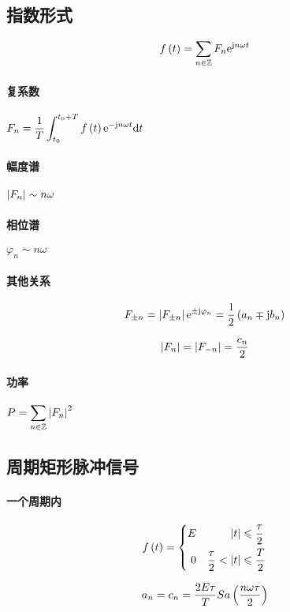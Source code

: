 \documentclass{article}
\begin{document}
\subsection{指数形式}

\[f\left(t\right)=\sum_{n\in\mathbb Z} F_n\mathrm e^{\mathrm j n\omega t}\]

\paragraph{复系数}$\displaystyle F_n=\frac1T\int_{t_0}^{t_0+T}f\left(t\right)\mathrm e^{-\mathrm j n\omega t}\mathrm d t$

\paragraph{幅度谱}$\left|F_n\right|\sim n\omega$

\paragraph{相位谱}$\varphi_n\sim n\omega$

\paragraph{其他关系}

\[F_{\pm n}=\left|F_{\pm n}\right|\mathrm e^{\pm\mathrm j\varphi_n}=\frac12\left(a_n\mp\mathrm j b_n\right)\]

\[\left|F_n\right|=\left|F_{-n}\right|=\frac{c_n}2\]

\paragraph{功率}$\displaystyle P=\sum_{n\in\mathbb Z}\left|F_n\right|^2$

\subsection{周期矩形脉冲信号}

\paragraph{一个周期内}

\[f\left(t\right)=
    \left\{\begin{aligned}
        E &  & \left|t\right|            & \leqslant\frac\tau2 \\
        0 &  & \frac\tau2<\left|t\right| & \leqslant\frac T2
    \end{aligned}\right.\]

\[a_n=c_n=\frac{2E\tau}TSa\left(\frac{n\omega\tau}2\right)\]
\end{document}
